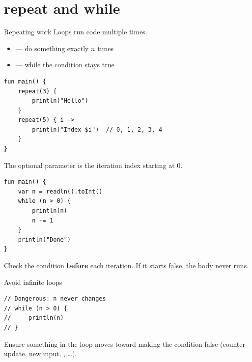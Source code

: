 \documentclass[aspectratio=169,11pt]{beamer}
\begin{document}
    \section{repeat and while}

    \begin{frame}{Repeating work}
        Loops run code multiple times.
        \vspace{0.5em}
        \begin{itemize}
            \item {} --- do something exactly $n$ times
            \item {} --- while the condition stays true
        \end{itemize}
    \end{frame}

    \begin{frame}[fragile]{}
        \begin{lstlisting}
fun main() {
    repeat(3) {
        println("Hello")
    }
    repeat(5) { i ->
        println("Index $i")  // 0, 1, 2, 3, 4
    }
}
        \end{lstlisting}
        \vspace{0.3em}
        The optional parameter is the iteration index starting at $0$.
    \end{frame}

    \begin{frame}[fragile]{}
        \begin{lstlisting}
fun main() {
    var n = readln().toInt()
    while (n > 0) {
        println(n)
        n -= 1
    }
    println("Done")
}
        \end{lstlisting}
        \vspace{0.3em}
        Check the condition \textbf{before} each iteration.
        If it starts false, the body never runs.
    \end{frame}

    \begin{frame}[fragile]{Avoid infinite loops}
        \begin{lstlisting}
// Dangerous: n never changes
// while (n > 0) {
//     println(n)
// }
        \end{lstlisting}
        \vspace{0.3em}
        Ensure something in the loop moves toward making the condition false
        (counter update, new input, , \ldots).
        \vspace{0.4em}
    \end{frame}
\end{document}

